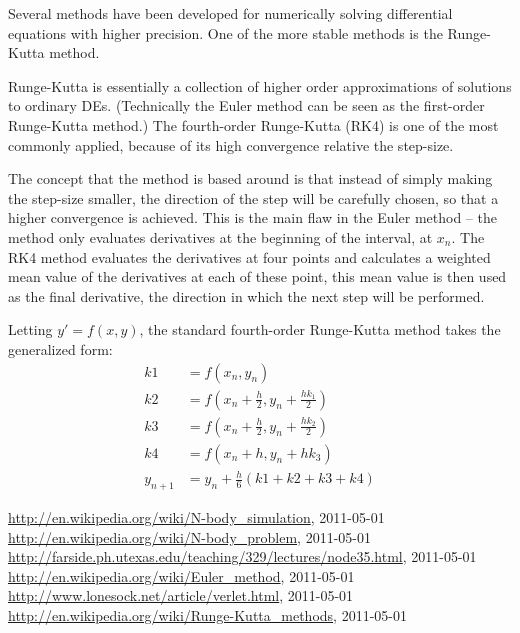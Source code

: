 \documentclass[titlepage, oneside, a4paper, 11pt]{article}
\begin{document}
Several methods have been developed for numerically solving
differential equations with higher precision. One of the more stable
methods is the Runge-Kutta method.

Runge-Kutta is essentially a collection of higher order approximations
of solutions to ordinary DEs. (Technically the Euler method can be
seen as the first-order Runge-Kutta method.) The fourth-order
Runge-Kutta (RK4) is one of the most commonly applied, because of its
high convergence relative the step-size.

The concept that the method is based around is that instead of simply
making the step-size smaller, the direction of the step will be
carefully chosen, so that a higher convergence is achieved. This is
the main flaw in the Euler method -- the method only evaluates
derivatives at the beginning of the interval, at $x_n$. The RK4 method
evaluates the derivatives at four points and calculates a weighted
mean value of the derivatives at each of these point, this mean value
is then used as the final derivative, the direction in which the next
step will be performed.

Letting $y' = f(x, y)$, the standard fourth-order Runge-Kutta method takes the generalized form:
\begin{align*}
k1 &= f\left(x_n, y_n\right) \\
k2 &= f\left(x_n + \frac{h}{2}, y_n + \frac{hk_1}{2}\right) \\
k3 &= f\left(x_n + \frac{h}{2}, y_n + \frac{hk_2}{2}\right) \\
k4 &= f\left(x_n + h, y_n + hk_3\right) \\
y_{n+1} &= y_n + \frac{h}{6}(k1 + k2 + k3 + k4)
\end{align*}


\newpage
\begin{thebibliography}{99}
  \url{http://en.wikipedia.org/wiki/N-body_simulation}, 2011-05-01
  \url{http://en.wikipedia.org/wiki/N-body_problem}, 2011-05-01
  \url{http://farside.ph.utexas.edu/teaching/329/lectures/node35.html},
  2011-05-01
  \url{http://en.wikipedia.org/wiki/Euler_method}, 2011-05-01
  \url{http://www.lonesock.net/article/verlet.html}, 2011-05-01
  \url{http://en.wikipedia.org/wiki/Runge-Kutta_methods}, 2011-05-01
\end{thebibliography}
\end{document}
